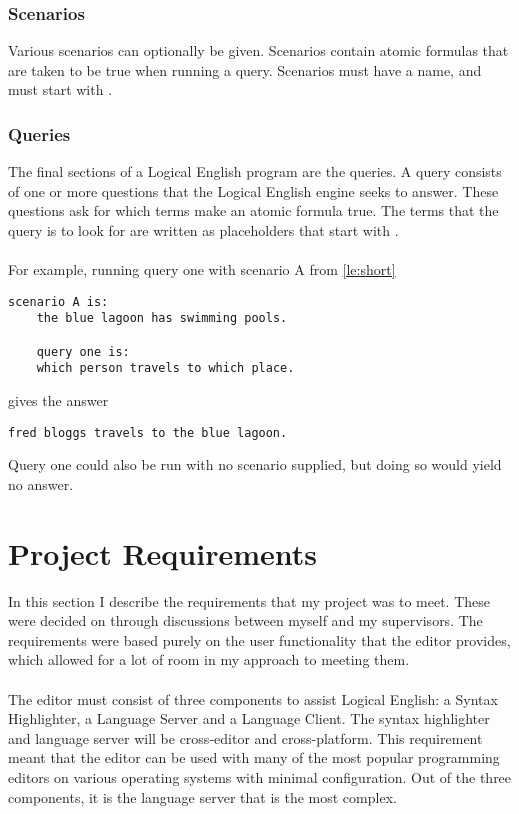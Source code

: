 \documentclass[../main.tex]{subfiles}
\begin{document}
\subsubsection{Scenarios}
Various scenarios can optionally be given. Scenarios contain atomic formulas that are taken to be true when running a query. Scenarios must have a name, and must start with 
. 

\subsubsection{Queries}
The final sections of a Logical English program are the queries. A query consists of one or more questions that the Logical English engine seeks to answer. These questions ask for which terms make an atomic formula true. The terms that the query is to look for are written as placeholders that start with . 
\\
\\
For example, running query one with scenario A from \ref{le:short}
\begin{lstlisting}[language={LE}]
    scenario A is:
    the blue lagoon has swimming pools.

    query one is:
    which person travels to which place.
\end{lstlisting}
gives the answer
\begin{lstlisting}[language={LE}]
    fred bloggs travels to the blue lagoon.
\end{lstlisting}
Query one could also be run with no scenario supplied, but doing so would yield no answer.

\newpage
\section{Project Requirements}
In this section I describe the requirements that my project was to meet. These were decided on through discussions between myself and my supervisors. The requirements were based purely on the user functionality that the editor provides, which allowed for a lot of room in my approach to meeting them.
\\
\\
The editor must consist of three components to assist Logical English: a Syntax Highlighter, a Language Server and a Language Client. The syntax highlighter and language server will be cross-editor and cross-platform. This requirement meant that the editor can be used with many of the most popular programming editors on various operating systems with minimal configuration. Out of the three components, it is the language server that is the most complex.
\end{document}
